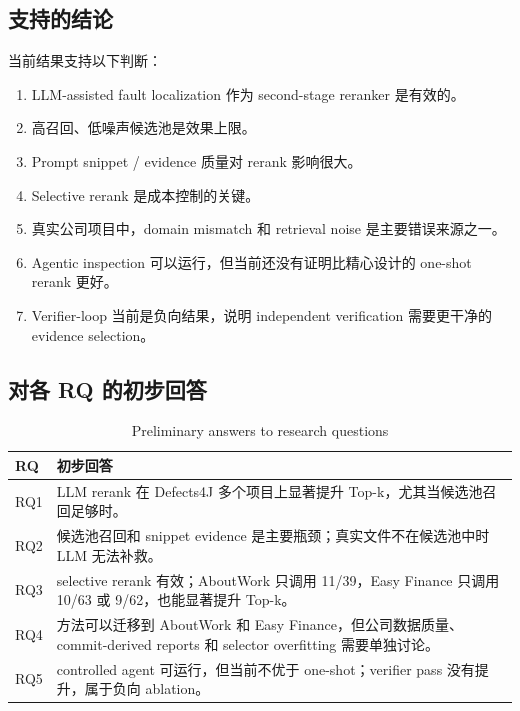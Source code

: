 \documentclass[12pt,a4paper]{ctexart}
\begin{document}
\subsection{支持的结论}

当前结果支持以下判断：

\begin{enumerate}
  \item LLM-assisted fault localization 作为 second-stage reranker 是有效的。
  \item 高召回、低噪声候选池是效果上限。
  \item Prompt snippet / evidence 质量对 rerank 影响很大。
  \item Selective rerank 是成本控制的关键。
  \item 真实公司项目中，domain mismatch 和 retrieval noise 是主要错误来源之一。
  \item Agentic inspection 可以运行，但当前还没有证明比精心设计的 one-shot rerank 更好。
  \item Verifier-loop 当前是负向结果，说明 independent verification 需要更干净的 evidence selection。
\end{enumerate}

\subsection{对各 RQ 的初步回答}

\begin{table}[H]
\centering
\caption{Preliminary answers to research questions}
\label{tab:rq-answers}
\begin{tabularx}{\textwidth}{@{}lY@{}}
\toprule
RQ & 初步回答 \\
\midrule
RQ1 & LLM rerank 在 Defects4J 多个项目上显著提升 Top-k，尤其当候选池召回足够时。 \\
RQ2 & 候选池召回和 snippet evidence 是主要瓶颈；真实文件不在候选池中时 LLM 无法补救。 \\
RQ3 & selective rerank 有效；AboutWork 只调用 11/39，Easy Finance 只调用 10/63 或 9/62，也能显著提升 Top-k。 \\
RQ4 & 方法可以迁移到 AboutWork 和 Easy Finance，但公司数据质量、commit-derived reports 和 selector overfitting 需要单独讨论。 \\
RQ5 & controlled agent 可运行，但当前不优于 one-shot；verifier pass 没有提升，属于负向 ablation。 \\
\bottomrule
\end{tabularx}
\end{table}
\end{document}
